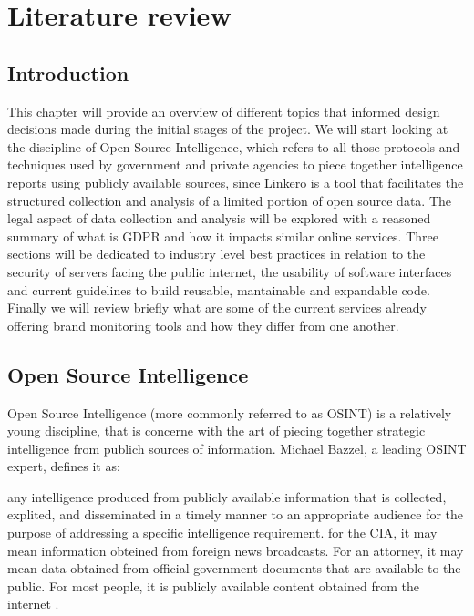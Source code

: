 \chapter{Literature review}

\section{Introduction}
This chapter will provide an overview of different topics that informed design
decisions made during the initial stages of the project. We will start looking
at the discipline of Open Source Intelligence, which refers to all those
protocols and techniques used by government and private agencies to piece
together intelligence reports using publicly available sources, since Linkero is
a tool that facilitates the structured collection and analysis of a limited
portion of open source data. The legal aspect of data collection and analysis
will be explored with a reasoned summary of what is GDPR and how it impacts
similar online services. Three sections will be dedicated to industry level best
practices in relation to the security of servers facing the public internet, the
usability of software interfaces and current guidelines to build reusable,
mantainable and expandable code. Finally we will review briefly what are some of
the current services already offering brand monitoring tools and how they differ
from one another.


\section{Open Source Intelligence}
Open Source Intelligence (more commonly referred to as OSINT) is a relatively
young discipline, that is concerne with the art of piecing together strategic
intelligence from publich sources of information. Michael Bazzel, a leading OSINT expert,
defines it as:
\begin{displayquote}
any intelligence produced from publicly available information that is collected,
explited, and disseminated in a timely manner to an appropriate audience for the
purpose of addressing a specific intelligence requirement. for the CIA, it may
mean information obteined from foreign news broadcasts. For an attorney, it may
mean data obtained from official government documents that are available to the
public. For most people, it is publicly available content obtained from the
internet \cite{MB15}.
\end{displayquote}

